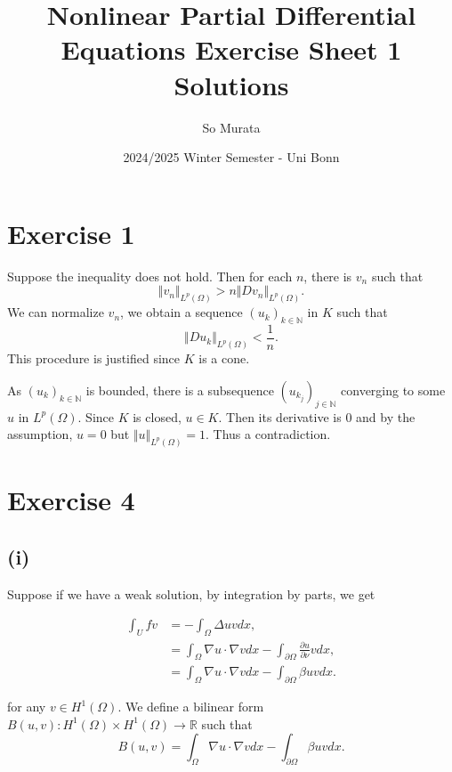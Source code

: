 \documentclass{article}
\title{Nonlinear Partial Differential Equations Exercise Sheet 1 Solutions}
\author{So Murata}
\date{2024/2025 Winter Semester - Uni Bonn}
\begin{document}
\maketitle
\section*{Exercise 1}

Suppose the inequality does not hold. Then for each $n$, there is $v_n$ such that
\begin{equation*}
\Vert v_n\Vert_{L^p(\Omega)} > n\Vert Dv_n\Vert_{L^p(\Omega)}.
\end{equation*}
We can normalize $v_n$, we obtain a sequence $(u_k)_{k\in\mathbb{N}}$ in $K$ such that
\begin{equation*}
\Vert Du_k\Vert_{L^p(\Omega)} < {\frac 1 n}.
\end{equation*}
This procedure is justified since $K$ is a cone.\\
\par As $(u_k)_{k\in\mathbb{N}}$ is bounded, there is a subsequence $(u_{k_j})_{j\in\mathbb{N}}$ converging to some $u$ in $L^p(\Omega)$. Since $K$ is closed, $u\in K$. Then its derivative is $0$ and by the assumption, $u=0$ but $\Vert u\Vert_{L^p(\Omega)}=1$. Thus a contradiction.

\section*{Exercise 4}

\subsection*{(i)}

Suppose if we have a weak solution, by integration by parts, we get

\begin{align*}
\int_U fv &=-\int_\Omega \Delta uvdx,\\
& =  \int_{\Omega}\nabla u\cdot\nabla vdx-\int_{\partial\Omega}{\frac {\partial u} {\partial \nu}}vdx ,\\
&= \int_{\Omega}\nabla u\cdot\nabla vdx-\int_{\partial\Omega}\beta uvdx .
\end{align*}

for any $v\in H^1(\Omega)$. We define a bilinear form $B(u,v):H^1(\Omega)\times H^1(\Omega)\to\mathbb{R}$ such that
\begin{equation*}
B(u,v) =  \int_{\Omega}\nabla u\cdot\nabla vdx-\int_{\partial\Omega}\beta uvdx.
\end{equation*}
\end{document}
